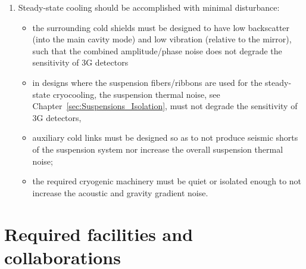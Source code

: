 \begin{enumerate}
\item Steady-state cooling should be accomplished with minimal disturbance:
      \begin{itemize}
        \item the surrounding cold shields must be designed to have low backscatter (into the main cavity mode) and low vibration (relative to the mirror), such that the combined amplitude/phase noise does not degrade the sensitivity of 3G detectors
        \item in designs where the suspension fibers/ribbons are used for the steady-state cryocooling, the suspension thermal noise, see Chapter~\ref{sec:Suspensions_Isolation}, must not degrade the sensitivity of 3G detectors,
        \item auxiliary cold links must be designed so as to not produce seismic shorts of the suspension system nor increase the overall suspension thermal noise;
        \item the required cryogenic machinery must be quiet or isolated enough to not increase the acoustic and gravity gradient noise.
      \end{itemize}
\end{enumerate}

%


\section{Required facilities and collaborations}

